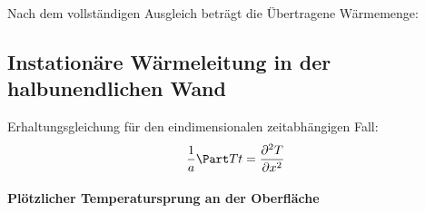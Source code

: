			Nach dem vollständigen Ausgleich beträgt die Übertragene Wärmemenge:
	\subsection{Instationäre Wärmeleitung in der halbunendlichen Wand} %
		Erhaltungsgleichung für den eindimensionalen zeit\-ab\-hängigen Fall:
		\[
			\frac{1}{a} \Part T t = \frac{\partial^2 T}{\partial x^2}
		\]
		
		\paragraph{Plötzlicher Temperatursprung an der Oberfläche} %
			~
			
